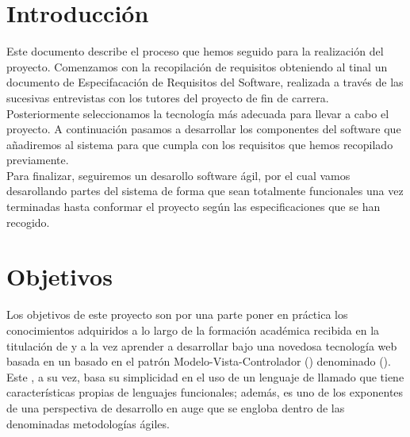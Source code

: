 

\section{Introducción}

Este documento describe el proceso que hemos seguido para la
realización del proyecto.  Comenzamos con la recopilación de
requisitos obteniendo al tinal un documento de Especifacación de
Requisitos del Software, realizada a través de las sucesivas
entrevistas con los tutores del
proyecto de fin de carrera.\\

Posteriormente seleccionamos la tecnología más adecuada para llevar a
cabo el proyecto. A continuación pasamos a desarrollar los componentes
del software que añadiremos al sistema para que cumpla con los
requisitos
que hemos recopilado previamente.\\

Para finalizar, seguiremos un desarollo software ágil, por el cual
vamos desarollando partes del sistema de forma que sean totalmente
funcionales una vez terminadas hasta conformar el proyecto según las
especificaciones que se han recogido.

\section{Objetivos}

Los objetivos de este proyecto son por una parte poner en práctica los
conocimientos adquiridos a lo largo de la formación académica recibida
en la titulación de  y a la vez aprender a desarrollar bajo una novedosa
tecnología web basada en un  basado en el patrón
Modelo-Vista-Controlador () denominado  ().\\

Este , a su vez, basa su simplicidad en el uso de
un lenguaje de  llamado  que tiene
características propias de lenguajes funcionales; además, es uno de
los exponentes de una perspectiva de desarrollo en auge que se engloba
dentro de las denominadas metodologías ágiles.\\

